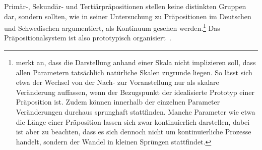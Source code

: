 Prim{\"a}r-, Sekund{\"a}r- und Tertiärpr{\"a}positionen stellen keine distinkten Gruppen dar, sondern sollten, wie \citet[261]{Lindqvist1994} in seiner Untersuchung zu Präpositionen im Deutschen und Schwedischen argumentiert, als Kontinuum gesehen werden.\footnote{\citet[18--21]{Lindqvist1994} merkt an, dass die Darstellung anhand einer Skala nicht implizieren soll, dass allen Parametern tats{\"a}chlich nat{\"u}rliche Skalen zugrunde liegen. 
So l{\"a}sst sich etwa der Wechsel von der Nach- zur Voranstellung nur als skalare Ver{\"a}nderung auffassen, wenn der Bezugspunkt der idealisierte Prototyp einer Präposition ist.
Zudem können innerhalb der einzelnen Parameter Ver{\"a}nderungen durchaus sprunghaft stattfinden. Manche Parameter wie etwa die L{\"a}nge einer Pr{\"a}position lassen sich zwar kontinuierlich darstellen, dabei ist aber zu beachten, dass es sich dennoch nicht um kontinuierliche Prozesse handelt, sondern der Wandel in kleinen Spr{\"u}ngen stattfindet.}
Das Pr{\"a}positionalsystem ist also prototypisch organisiert~\citep[s.][33--34]{Bene.1975}. 

